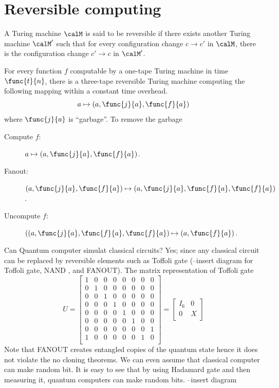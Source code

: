 \section{Reversible computing}
A Turing machine \(\calM\) is said to be reversible if there exists another Turing machine \(\calM'\) such that for every configuration change \(c \to c'\) in \(\calM\), there is the configuration change \(c' \to c\) in \(\calM'\).

\begin{theorem}[Bennett 1973]
    For every function \(f\) computable by a one-tape Turing machine in time \(\func{t}{n}\), there is a three-tape reversible Turing machine computing the following mapping within a constant time overhead.
    \begin{equation*}
        a \mapsto (a,\func{j}{a}, \func{f}{a})
    \end{equation*}
    where \(\func{j}{a}\) is ``garbage''. To remove the garbage
    \begin{description}
        \item [Compute \(f\):] \(a \mapsto (a,\func{j}{a}, \func{f}{a})\).
        \item [Fanout: ]\( (a,\func{j}{a}, \func{f}{a}) \mapsto (a,\func{j}{a}, \func{f}{a},\func{f}{a})\).
        \item [Uncompute \(f\):] \( ( (a,\func{j}{a}, \func{f}{a},\func{f}{a}) \mapsto (a,\func{f}{a})\).
    \end{description}
\end{theorem}

Can Quantum computer simulat classical circuits? Yes; since any classical circuit can be replaced by reversible elements such as Toffoli gate (--insert diagram for Toffoli gate, NAND , and FANOUT). The matrix representation of Toffoli gate 
\begin{equation*}
    U = \begin{bmatrix}
        1 & 0 & 0 & 0 & 0 & 0 &0 & 0\\
        0 & 1 & 0 & 0 & 0 & 0 &0 & 0\\
        0 & 0 & 1 & 0 & 0 & 0 &0 & 0\\
        0 & 0 & 0 & 1 & 0 & 0 &0 & 0\\
        0 & 0 & 0 & 0 & 1 & 0 &0 & 0\\
        0 & 0 & 0 & 0 & 0 & 1 &0 & 0\\
        0 & 0 & 0 & 0 & 0 & 0 &0 & 1\\
        1 & 0 & 0 & 0 & 0 & 0 &1 & 0\\
    \end{bmatrix}
    = \begin{bmatrix}
        I_6 & 0 \\
        0 & X\\
    \end{bmatrix}
\end{equation*}
Note that FANOUT creates entangled copies of the quantum state hence it does not violate the no cloning theorems.
We can even assume that classical computer can make random bit. It is easy to see that by using Hadamard gate and then measuring it, quantum computers can make random bits. --insert diagram

